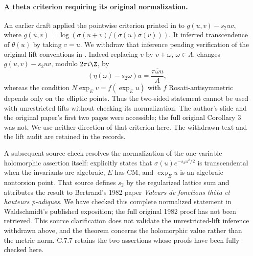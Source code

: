 \paragraph{A theta criterion requiring its original normalization.}
An earlier draft applied the pointwise criterion printed in
\citet[final slide, comment (c)]{bertrand2017} to
$g(u,v)-s_2uv$, where
$g(u,v)=\log(\sigma(u+v)/(\sigma(u)\sigma(v)))$.
It inferred transcendence of $\theta(u)$ by taking $v=u$.
We withdraw that inference pending verification of the original
lift conventions in \citet[Corollary 3]{bertrand1984}.
Indeed replacing $v$ by $v+\omega$, $\omega\in\Lambda$,
changes $g(u,v)-s_2uv$, modulo $2\pi i\Z$, by
\[
 (\eta(\omega)-s_2\omega)u=\frac{\pi\bar\omega u}{A},
\]
whereas the condition $N\exp_Ev=f(\exp_Eu)$ with $f$
Rosati-antisymmetric depends only on the elliptic points.
Thus the two-sided statement cannot be used with unrestricted
lifts without checking its normalization. The author's slide
and the original paper's first two pages were accessible;
the full original Corollary 3 was not. We use neither direction
of that criterion here. The withdrawn text and the lift audit
are retained in the records.

A subsequent source check resolves the normalization of the
one-variable holomorphic assertion itself:
\citet[p.~15-03]{waldschmidt1988theta} explicitly states that
$\sigma(u)e^{-s_2u^2/2}$ is transcendental when the invariants
are algebraic, $E$ has CM, and $\exp_Eu$ is an algebraic
nontorsion point.  That source defines $s_2$ by the regularized
lattice sum and attributes the result to Bertrand's 1982
paper \emph{Valeurs de fonctions th\^eta et hauteurs p-adiques}.
We have checked this complete normalized statement in
Waldschmidt's published exposition; the full original 1982
proof has not been retrieved.  This source clarification
does not validate the unrestricted-lift inference withdrawn
above, and the theorem concerns the holomorphic value rather
than the metric norm.  C.7.7 retains the two assertions whose
proofs have been fully checked here.


